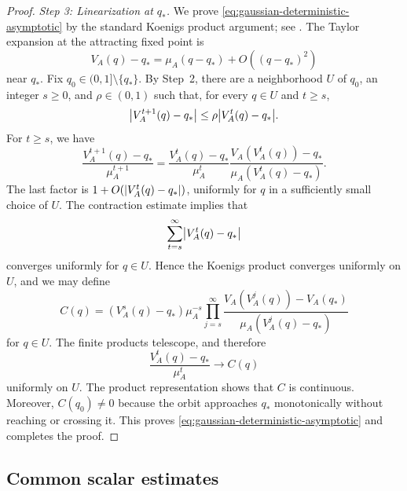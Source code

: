 \documentclass[11pt,reqno,a4paper]{article}
\begin{document}
\begin{proof}
  \emph{Step 3: Linearization at $q_\ast$.}
  We prove \cref{eq:gaussian-deterministic-asymptotic} by the standard Koenigs
  product argument; see
  \cite[Ch.~II, Sec.~2, Theorem~2.1]{carleson1993complex}. The Taylor expansion
  at the attracting fixed point is
  \begin{equation*}
    V_A(q)-q_\ast
    =
    \mu_A(q-q_\ast)+O((q-q_\ast)^2)
  \end{equation*}
  near $q_\ast$. Fix $q_0\in(0,1]\setminus\{q_\ast\}$. By Step~2, there are
  a neighborhood $U$ of $q_0$, an integer $s\geq0$, and $\rho\in(0,1)$ such
  that, for every $q\in U$ and $t\geq s$,
  \begin{equation*}
    \abs{V_A^{t+1}(q)-q_\ast}
    \leq
    \rho\abs{V_A^t(q)-q_\ast}.
  \end{equation*}
  For $t\geq s$, we have
  \begin{equation*}
    \frac{V_A^{t+1}(q)-q_\ast}{\mu_A^{t+1}}
    =
    \frac{V_A^t(q)-q_\ast}{\mu_A^t}
    \frac{V_A(V_A^t(q))-q_\ast}
    {\mu_A(V_A^t(q)-q_\ast)} .
  \end{equation*}
  The last factor is $1+O(\abs{V_A^t(q)-q_\ast})$, uniformly for $q$ in a
  sufficiently small choice of $U$. The contraction estimate implies that
  \begin{equation*}
    \sum_{t=s}^\infty
    \abs{V_A^t(q)-q_\ast}
  \end{equation*}
  converges uniformly for $q\in U$. Hence the Koenigs product converges
  uniformly on $U$, and we may define
  \begin{equation*}
    C(q)
    =
    (V_A^{s}(q)-q_\ast)\mu_A^{-s}
    \prod_{j=s}^\infty
    \frac{V_A(V_A^j(q))-V_A(q_\ast)}
    {\mu_A(V_A^j(q)-q_\ast)}
  \end{equation*}
  for $q\in U$. The finite products telescope, and therefore
  \begin{equation*}
    \frac{V_A^t(q)-q_\ast}{\mu_A^t}
    \longrightarrow
    C(q)
  \end{equation*}
  uniformly on $U$. The product representation shows that $C$ is continuous.
  Moreover, $C(q_0)\neq0$ because the orbit approaches $q_\ast$ monotonically
  without reaching or crossing it. This proves
  \cref{eq:gaussian-deterministic-asymptotic} and completes the proof.
\end{proof}

\subsection{Common scalar estimates}
\label{subsec:common-scalar-estimates}
\end{document}
